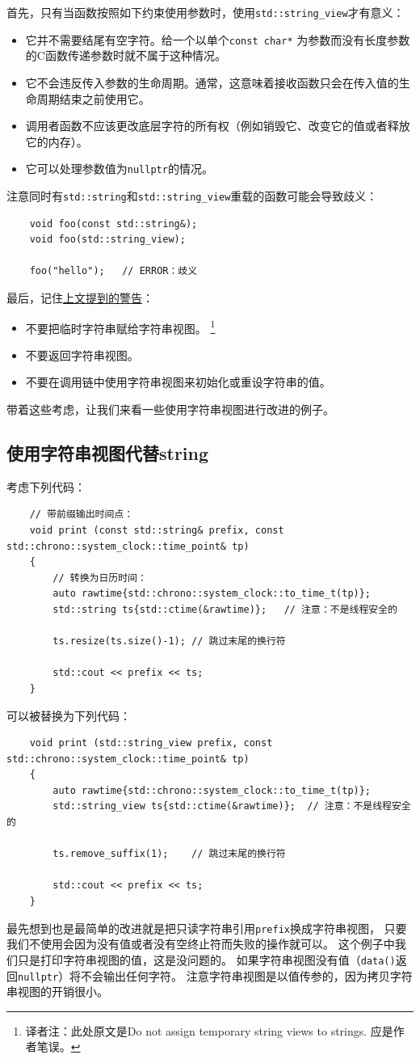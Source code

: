 首先，只有当函数按照如下约束使用参数时，使用\texttt{std::string\_view}才有意义：
\begin{itemize}
    \item 它并不需要结尾有空字符。给一个以单个\texttt{const char*}
    为参数而没有长度参数的C函数传递参数时就不属于这种情况。
    \item 它不会违反传入参数的生命周期。通常，这意味着接收函数只会在传入值的生命周期结束之前使用它。
    \item 调用者函数不应该更改底层字符的所有权（例如销毁它、改变它的值或者释放它的内存）。
    \item 它可以处理参数值为\texttt{nullptr}的情况。
\end{itemize}
注意同时有\texttt{std::string}和\texttt{std::string\_view}重载的函数可能会导致歧义：
\begin{lstlisting}
    void foo(const std::string&);
    void foo(std::string_view);

    foo("hello");   // ERROR：歧义
\end{lstlisting}
最后，记住\hyperref[ch19.3.1]{上文提到的警告}：
\begin{itemize}
    \item 不要把临时字符串赋给字符串视图。
    \footnote{译者注：此处原文是Do not assign temporary string views to strings. 应是作者笔误。}
    \item 不要返回字符串视图。
    \item 不要在调用链中使用字符串视图来初始化或重设字符串的值。
\end{itemize}
带着这些考虑，让我们来看一些使用字符串视图进行改进的例子。

\subsection{使用字符串视图代替string}
考虑下列代码：
\begin{lstlisting}
    // 带前缀输出时间点：
    void print (const std::string& prefix, const std::chrono::system_clock::time_point& tp)
    {
        // 转换为日历时间：
        auto rawtime{std::chrono::system_clock::to_time_t(tp)};
        std::string ts{std::ctime(&rawtime)};   // 注意：不是线程安全的

        ts.resize(ts.size()-1); // 跳过末尾的换行符

        std::cout << prefix << ts;
    }
\end{lstlisting}
可以被替换为下列代码：
\begin{lstlisting}
    void print (std::string_view prefix, const std::chrono::system_clock::time_point& tp)
    {
        auto rawtime{std::chrono::system_clock::to_time_t(tp)};
        std::string_view ts{std::ctime(&rawtime)};  // 注意：不是线程安全的

        ts.remove_suffix(1);    // 跳过末尾的换行符

        std::cout << prefix << ts;
    }
\end{lstlisting}
最先想到也是最简单的改进就是把只读字符串引用\texttt{prefix}换成字符串视图，
只要我们不使用会因为没有值或者没有空终止符而失败的操作就可以。
这个例子中我们只是打印字符串视图的值，这是没问题的。
如果字符串视图没有值（\texttt{data()}返回\texttt{nullptr}）将不会输出任何字符。
注意字符串视图是以值传参的，因为拷贝字符串视图的开销很小。

